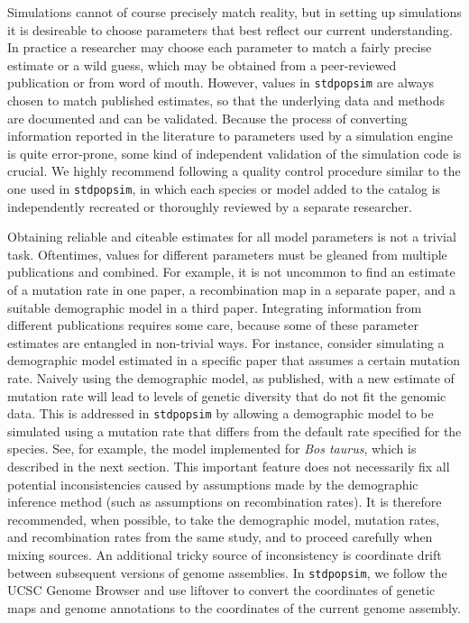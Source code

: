 \documentclass[hidelinks]{article}
\newcommand{\stdpopsim}{\texttt{stdpopsim}\xspace}
\begin{document}
Simulations cannot of course precisely match reality, but in setting up simulations
it is desireable to choose parameters that best reflect our current understanding.
In practice a researcher may choose each parameter to match a fairly precise estimate or a wild guess,
which may be obtained from a peer-reviewed publication or from word of mouth.
However, values in \stdpopsim are always chosen to match published estimates,
so that the underlying data and methods are documented and can be validated.
Because the process of converting information reported in the literature to parameters used by a simulation engine is quite error-prone,
some kind of independent validation of the simulation code is crucial.
We highly recommend following a quality control procedure similar to the one used in \stdpopsim,
in which each species or model added to the catalog is independently recreated or thoroughly reviewed by a separate researcher.


Obtaining reliable and citeable estimates for all model parameters is not a trivial task.
Oftentimes, values for different parameters must be gleaned from multiple publications and combined.
For example, it is not uncommon to find an estimate of a mutation rate in one paper,
a recombination map in a separate paper, and a suitable demographic model in a third paper.
Integrating information from different publications requires some care,
because some of these parameter estimates are entangled in non-trivial ways.
For instance, consider simulating a demographic model estimated in a specific paper that assumes
a certain mutation rate.
Naively using the demographic model, as published, with a new estimate of mutation rate
will lead to levels of genetic diversity that do not fit the genomic data.
This is addressed in \stdpopsim by allowing a demographic model to be simulated using a mutation rate that differs from the default rate specified for the species.
See, for example, the model implemented for \emph{Bos taurus},
which is described in the next section.
This important feature does not necessarily fix all potential inconsistencies
caused by assumptions made by the demographic inference method
(such as assumptions on recombination rates).
It is therefore recommended, when possible, to take the demographic model,
mutation rates, and recombination rates from the same study,
and to proceed carefully when mixing sources.
An additional tricky source of inconsistency is coordinate drift between 
subsequent versions of genome assemblies.
In \stdpopsim, we follow the UCSC Genome Browser
and use liftover to convert the coordinates of genetic maps and genome annotations
to the coordinates of the current genome assembly.
\end{document}
